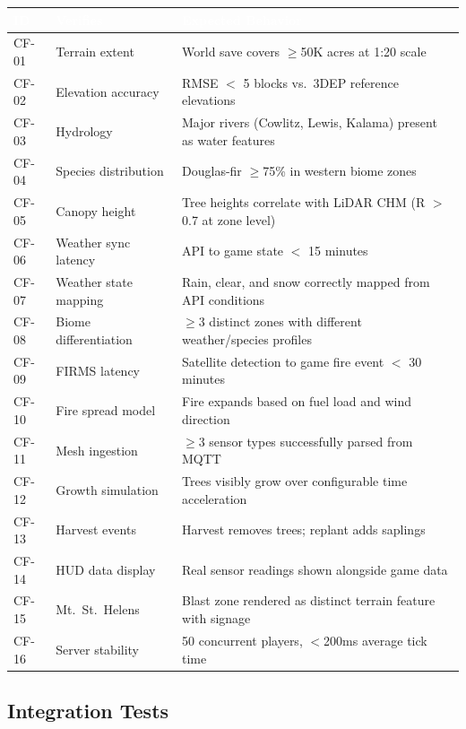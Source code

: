 \documentclass[11pt,letterpaper]{article}
\newcommand{\tableheader}[1]{\textbf{\sffamily\textcolor{white}{#1}}}
\begin{document}
\begin{center}
\begin{tabularx}{\textwidth}{C{1.2cm}L{3cm}X}
\toprule
{}
\tableheader{ID} & \tableheader{Verifies} & \tableheader{Expected Behavior} \\
\midrule
CF-01 & Terrain extent & World save covers $\geq$50K acres at 1:20 scale \\
CF-02 & Elevation accuracy & RMSE $<$ 5 blocks vs.\ 3DEP reference elevations \\
CF-03 & Hydrology & Major rivers (Cowlitz, Lewis, Kalama) present as water features \\
CF-04 & Species distribution & Douglas-fir $\geq$75\% in western biome zones \\
CF-05 & Canopy height & Tree heights correlate with LiDAR CHM (R $>$ 0.7 at zone level) \\
CF-06 & Weather sync latency & API to game state $<$ 15 minutes \\
CF-07 & Weather state mapping & Rain, clear, and snow correctly mapped from API conditions \\
CF-08 & Biome differentiation & $\geq$3 distinct zones with different weather/species profiles \\
CF-09 & FIRMS latency & Satellite detection to game fire event $<$ 30 minutes \\
CF-10 & Fire spread model & Fire expands based on fuel load and wind direction \\
CF-11 & Mesh ingestion & $\geq$3 sensor types successfully parsed from MQTT \\
CF-12 & Growth simulation & Trees visibly grow over configurable time acceleration \\
CF-13 & Harvest events & Harvest removes trees; replant adds saplings \\
CF-14 & HUD data display & Real sensor readings shown alongside game data \\
CF-15 & Mt.\ St.\ Helens & Blast zone rendered as distinct terrain feature with signage \\
CF-16 & Server stability & 50 concurrent players, $<$200ms average tick time \\
\bottomrule
\end{tabularx}
\end{center}

\subsection{Integration Tests}
\end{document}
